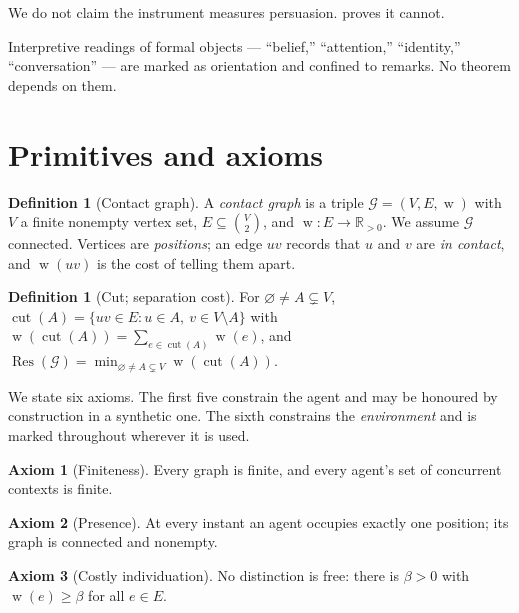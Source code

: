 \documentclass[11pt,a4paper]{article}
\theoremstyle{clstyle}
\theoremstyle{definition}
\newtheorem{definition}[theorem]{Definition}
\newtheorem{axiom}{Axiom}
\theoremstyle{remark}
\DeclareMathOperator{\wt}{w}
\DeclareMathOperator{\cut}{cut}
\DeclareMathOperator{\Res}{Res}
\newcommand{\R}{\mathbb{R}}
\newcommand{\Gph}{\mathcal{G}}
\newcommand{\V}{V}
\newcommand{\E}{E}
\newcommand{\flo}{\beta}
\begin{document}
We do not claim the instrument measures persuasion. 
proves it cannot.

Interpretive readings of formal objects --- ``belief,'' ``attention,''
``identity,'' ``conversation'' --- are marked as orientation and confined to
remarks. No theorem depends on them.

\section{Primitives and axioms}
\label{sec:axioms}

\begin{definition}[Contact graph]
\label{def:contact}
A \emph{contact graph} is a triple $\Gph=(\V,\E,\wt)$ with $\V$ a finite
nonempty vertex set, $\E\subseteq\binom{\V}{2}$, and
$\wt:\E\to\R_{>0}$. We assume $\Gph$ connected. Vertices are
\emph{positions}; an edge $uv$ records that $u$ and $v$ are \emph{in
contact}, and $\wt(uv)$ is the cost of telling them apart.
\end{definition}

\begin{definition}[Cut; separation cost]
\label{def:cut}
For $\varnothing\neq A\subsetneq\V$,
$\cut(A)=\{uv\in\E: u\in A,\ v\in\V\setminus A\}$ with
$\wt(\cut(A))=\sum_{e\in\cut(A)}\wt(e)$, and
$\Res(\Gph)=\min_{\varnothing\neq A\subsetneq\V}\wt(\cut(A))$.
\end{definition}

We state six axioms. The first five constrain the agent and may be honoured
by construction in a synthetic one. The sixth constrains the
\emph{environment} and is marked throughout wherever it is used.

\begin{axiom}[Finiteness]
\label{ax:finite}
Every graph is finite, and every agent's set of concurrent contexts is
finite.
\end{axiom}

\begin{axiom}[Presence]
\label{ax:present}
At every instant an agent occupies exactly one position; its graph is
connected and nonempty.
\end{axiom}

\begin{axiom}[Costly individuation]
\label{ax:costly}
No distinction is free: there is $\flo>0$ with $\wt(e)\ge\flo$ for all
$e\in\E$.
\end{axiom}
\end{document}
